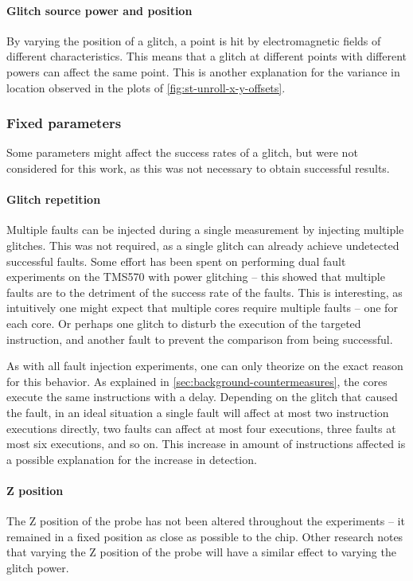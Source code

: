\documentclass[10pt]{article}
\newcommand{\TI}{TMS570\xspace}
\begin{document}
        \paragraph*{Glitch source power and position}
          By varying the position of a glitch, a point is hit by electromagnetic fields of different characteristics. This means that a glitch at different points with different powers can affect the same point. This is another explanation for the variance in location observed in the plots of \autoref{fig:st-unroll-x-y-offsets}.


    \subsubsection{Fixed parameters }

      Some parameters might affect the success rates of a glitch, but were not considered for this work, as this was not necessary to obtain successful results.  

        \paragraph*{Glitch repetition}
          Multiple faults can be injected during a single measurement by injecting multiple glitches. This was not required, as a single glitch can already achieve undetected successful faults. Some effort has been spent on performing dual fault experiments on the \TI with power glitching -- this showed that multiple faults are to the detriment of the success rate of the faults. This is interesting, as intuitively one might expect that multiple cores require multiple faults -- one for each core. Or perhaps one glitch to disturb the execution of the targeted instruction, and another fault to prevent the comparison from being successful. 

          As with all fault injection experiments, one can only theorize on the exact reason for this behavior. 
          As explained in \autoref{sec:background-countermeasures}, the cores execute the same instructions with a delay. Depending on the glitch that caused the fault, in an ideal situation a single fault will affect at most two instruction executions directly, two faults can affect at most four executions, three faults at most six executions, and so on. This increase in amount of instructions affected is a possible explanation for the increase in detection.
        \paragraph*{Z position}
          The Z position of the probe has not been altered throughout the experiments -- it remained in a fixed position as close as possible to the chip. Other research \cite{moro_electromagnetic_2013} notes that varying the Z position of the probe will have a similar effect to varying the glitch power. 
\end{document}
